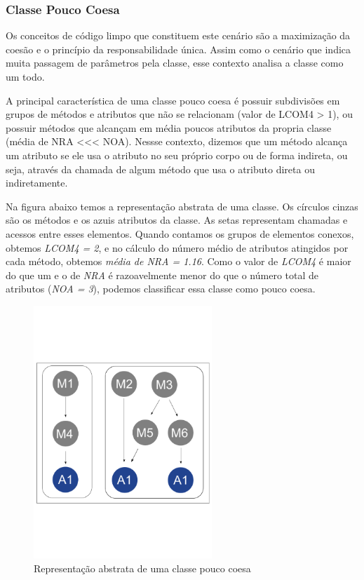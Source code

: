                                       
                      

\subsubsection{Classe Pouco Coesa}
    
Os conceitos de código limpo que constituem este cenário são a maximização da coesão e o princípio da responsabilidade única. Assim como o cenário que indica muita passagem de parâmetros pela classe, esse contexto analisa a classe como um todo.
	
A principal característica de uma classe pouco coesa é possuir subdivisões em grupos de métodos e atributos que não se relacionam (valor de LCOM4 > 1), ou possuir métodos que alcançam em média poucos atributos da propria classe (média de NRA <<< NOA). Nessse contexto, dizemos que um método alcança um atributo se ele usa o atributo no seu próprio corpo ou de forma indireta, ou seja, através da chamada de algum método que usa o atributo direta ou indiretamente.
	   
Na figura abaixo temos a representação abstrata de uma classe. Os círculos cinzas são os métodos e os azuis atributos da classe. As setas representam chamadas e acessos entre esses elementos. Quando contamos os grupos de elementos conexos, obtemos \textit{LCOM4 = 2}, e no cálculo do número médio de atributos atingidos por cada método, obtemos \textit{média de NRA = 1.16}. Como o valor de \textit{LCOM4} é maior do que um e o de \textit{NRA} é razoavelmente menor do que o número total de atributos (\textit{NOA = 3}), podemos classificar essa classe como pouco coesa.                  
		
\begin{figure}[htb]
	\centering
	\includegraphics[trim = 0mm 50mm 0mm 60mm, clip, width=0.6\textwidth]{codigos/exemplos_para_os_cenarios/classe_pouco_coesa.png}
	\caption{Representação abstrata de uma classe pouco coesa}
	\label{classe_pouco_coesa}
\end{figure}
	
